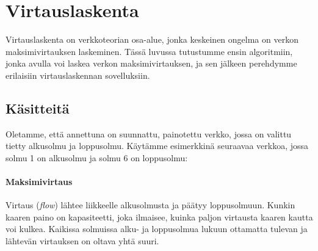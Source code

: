 \chapter{Virtauslaskenta}

Virtauslaskenta on verkkoteorian osa-alue,
jonka keskeinen ongelma on verkon maksimivirtauksen laskeminen.
Tässä luvussa tutustumme ensin algoritmiin,
jonka avulla voi laskea verkon maksimivirtauksen,
ja sen jälkeen perehdymme erilaisiin virtauslaskennan sovelluksiin.

\section{Käsitteitä}

Oletamme, että annettuna on suunnattu,
painotettu verkko, 
jossa on valittu tietty alkusolmu ja loppusolmu.
Käytämme esimerkkinä seuraavaa verkkoa,
jossa solmu 1 on alkusolmu ja solmu 6 on loppusolmu:

\begin{center}
\end{center}

\subsubsection{Maksimivirtaus}

Virtaus (\textit{flow})
lähtee liikkeelle alkusolmusta ja päätyy loppusolmuun.
Kunkin kaaren paino on kapasiteetti,
joka ilmaisee, kuinka paljon virtausta kaaren
kautta voi kulkea.
Kaikissa solmuissa alku- ja loppusolmua lukuun ottamatta
tulevan ja lähtevän virtauksen on oltava yhtä suuri.

